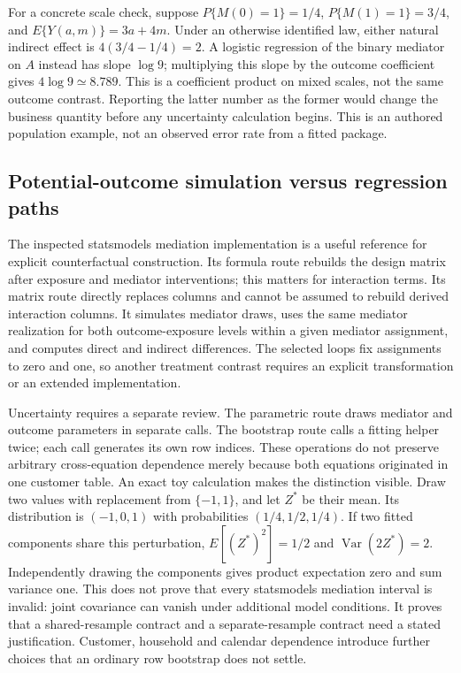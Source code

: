 For a concrete scale check, suppose $P\{M(0)=1\}=1/4$, $P\{M(1)=1\}=3/4$, and $E\{Y(a,m)\}=3a+4m$. Under an otherwise identified law, either natural indirect effect is $4(3/4-1/4)=2$. A logistic regression of the binary mediator on $A$ instead has slope $\log 9$; multiplying this slope by the outcome coefficient gives $4\log9\simeq8.789$. This is a coefficient product on mixed scales, not the same outcome contrast. Reporting the latter number as the former would change the business quantity before any uncertainty calculation begins. This is an authored population example, not an observed error rate from a fitted package. \citep{exec25_pymed_choice}

\subsection{Potential-outcome simulation versus regression paths}
The inspected statsmodels mediation implementation is a useful reference for explicit counterfactual construction. Its formula route rebuilds the design matrix after exposure and mediator interventions; this matters for interaction terms. Its matrix route directly replaces columns and cannot be assumed to rebuild derived interaction columns. It simulates mediator draws, uses the same mediator realization for both outcome-exposure levels within a given mediator assignment, and computes direct and indirect differences. The selected loops fix assignments to zero and one, so another treatment contrast requires an explicit transformation or an extended implementation. \citep{exec25_pymed_statsmodels}

Uncertainty requires a separate review. The parametric route draws mediator and outcome parameters in separate calls. The bootstrap route calls a fitting helper twice; each call generates its own row indices. These operations do not preserve arbitrary cross-equation dependence merely because both equations originated in one customer table. An exact toy calculation makes the distinction visible. Draw two values with replacement from $\{-1,1\}$, and let $Z^*$ be their mean. Its distribution is $(-1,0,1)$ with probabilities $(1/4,1/2,1/4)$. If two fitted components share this perturbation, $E[(Z^*)^2]=1/2$ and $\operatorname{Var}(2Z^*)=2$. Independently drawing the components gives product expectation zero and sum variance one. This does not prove that every statsmodels mediation interval is invalid: joint covariance can vanish under additional model conditions. It proves that a shared-resample contract and a separate-resample contract need a stated justification. Customer, household and calendar dependence introduce further choices that an ordinary row bootstrap does not settle. \citep{exec25_pymed_statsmodels,exec25_pymed_choice}

